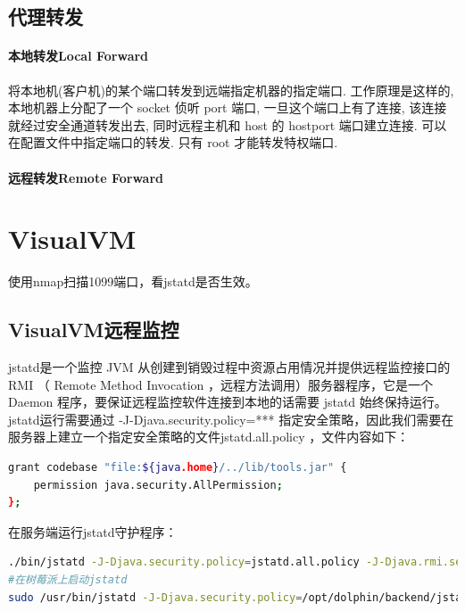 \documentclass[letter]{book}
\begin{document}
\subsection{代理转发}

\paragraph{本地转发Local Forward}将本地机(客户机)的某个端口转发到远端指定机器的指定端口. 工作原理是这样的, 本地机器上分配了一个 socket 侦听 port 端口, 一旦这个端口上有了连接, 该连接就经过安全通道转发出去, 同时远程主机和 host 的 hostport 端口建立连接. 可以在配置文件中指定端口的转发. 只有 root 才能转发特权端口. 

\paragraph{远程转发Remote Forward}

\section{VisualVM}

使用nmap扫描1099端口，看jstatd是否生效。

\subsection{VisualVM远程监控}

jstatd是一个监控 JVM 从创建到销毁过程中资源占用情况并提供远程监控接口的 RMI （ Remote Method Invocation ，远程方法调用）服务器程序，它是一个 Daemon 程序，要保证远程监控软件连接到本地的话需要 jstatd 始终保持运行。jstatd运行需要通过 -J-Djava.security.policy=*** 指定安全策略，因此我们需要在服务器上建立一个指定安全策略的文件jstatd.all.policy ，文件内容如下：

\begin{lstlisting}[language=Bash]
grant codebase "file:${java.home}/../lib/tools.jar" {  
	permission java.security.AllPermission;  
}; 
\end{lstlisting}


在服务端运行jstatd守护程序：

\begin{lstlisting}[language=Bash]
./bin/jstatd -J-Djava.security.policy=jstatd.all.policy -J-Djava.rmi.server.hostname=192.168.1.101 -J-Djava.rmi.server.logCalls=true -p 1011
#在树莓派上启动jstatd
sudo /usr/bin/jstatd -J-Djava.security.policy=/opt/dolphin/backend/jstatd.all.policy -J-Djava.rmi.server.hostname=192.168.31.25 -J-Djava.rmi.server.logCalls=true -p 1011
\end{lstlisting}
\end{document}
